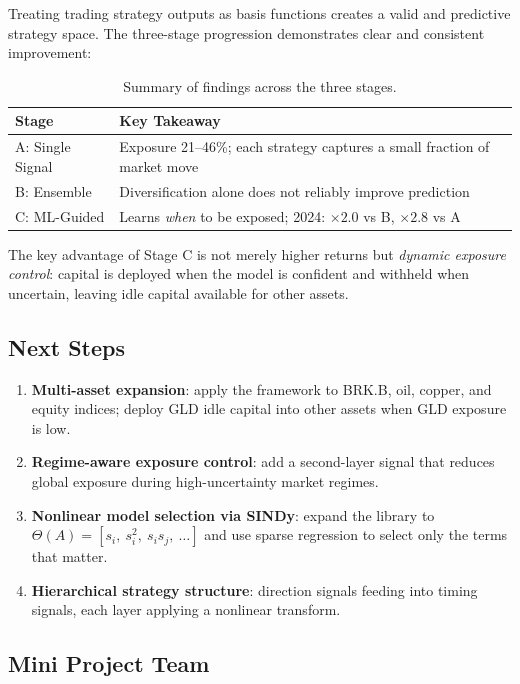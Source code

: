 \documentclass[11pt, letterpaper]{article}
\begin{document}
Treating trading strategy outputs as basis functions creates a valid and predictive
strategy space. The three-stage progression demonstrates clear and consistent improvement:

\begin{table}[h]
\centering
\caption{Summary of findings across the three stages.}
\label{tab:summary}
\begin{tabular}{ll}
\toprule
Stage & Key Takeaway \\
\midrule
A: Single Signal & Exposure 21--46\%; each strategy captures a small fraction of market move \\
B: Ensemble      & Diversification alone does not reliably improve prediction \\
C: ML-Guided     & Learns \textit{when} to be exposed; 2024: $\times 2.0$ vs B, $\times 2.8$ vs A \\
\bottomrule
\end{tabular}
\end{table}

The key advantage of Stage C is not merely higher returns but \textit{dynamic exposure
control}: capital is deployed when the model is confident and withheld when uncertain,
leaving idle capital available for other assets.

\subsection{Next Steps}

\begin{enumerate}
  \item \textbf{Multi-asset expansion}: apply the framework to BRK.B, oil, copper,
        and equity indices; deploy GLD idle capital into other assets when GLD
        exposure is low.
  \item \textbf{Regime-aware exposure control}: add a second-layer signal that
        reduces global exposure during high-uncertainty market regimes.
  \item \textbf{Nonlinear model selection via SINDy}: expand the library to
        $\Theta(A) = [s_i,\ s_i^2,\ s_i s_j,\ \ldots]$ and use sparse regression
        to select only the terms that matter.
  \item \textbf{Hierarchical strategy structure}: direction signals feeding into
        timing signals, each layer applying a nonlinear transform.
\end{enumerate}

\subsection{Mini Project Team}
\end{document}
